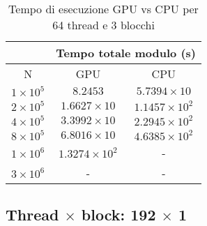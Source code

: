 \begin{table}[ht!]
    \begin{center}
        \renewcommand{\arraystretch}{1.5}
        \begin{adjustbox}{width=.45\textwidth}
            \begin{tabular}{ |c|c|c| }
                \hline
                \multicolumn{1}{|c}{} & \multicolumn{2}{|c|}{Tempo totale modulo (s)} \\
                \hline
                 N & GPU & CPU \\
                 \hline 
                 $1 \times 10^5$ & $8.2453$ & $5.7394 \times 10$ \\
                 \hline 
                 $2 \times 10^5$ & $1.6627 \times 10$ & $1.1457 \times 10^{2}$ \\
                 \hline 
                 $4 \times 10^5$ & $3.3992 \times 10$ & $2.2945 \times 10^{2}$ \\
                 \hline 
                 $8 \times 10^5$ & $6.8016 \times 10$ & $4.6385 \times 10^{2}$ \\
                 \hline 
                 $1 \times 10^6$ & $1.3274 \times 10^{2}$ & - \\
                 \hline 
                 $3 \times 10^6$ & - & - \\
                 \hline 
            \end{tabular}
        \end{adjustbox}
    \end{center}
    \caption{Tempo di esecuzione GPU vs CPU per 64 thread e 3 blocchi}
    \label{tab:time_table_64x3}
\end{table}


\newpage
\subsection{Thread $\times$ block: 192 $\times$ 1}

